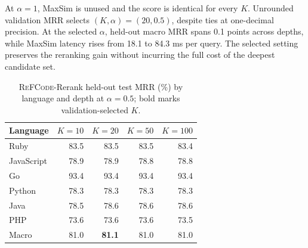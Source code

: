 \documentclass[11pt]{article}
\newcommand{\method}{\textsc{ReFCode}}
\begin{document}
At \(\alpha=1\), MaxSim is unused and the score is identical for every \(K\). Unrounded validation MRR selects \((K,\alpha)=(20,0.5)\), despite ties at one-decimal precision. At the selected \(\alpha\), held-out macro MRR spans 0.1 points across depths, while MaxSim latency rises from 18.1 to 84.3 ms per query. The selected setting preserves the reranking gain without incurring the full cost of the deepest candidate set.

\begin{table}[!t]
    \centering
    \captionsetup{skip=2pt}
    \scriptsize
    \setlength{\tabcolsep}{1.8pt}
    \renewcommand{\arraystretch}{0.92}
    \begin{tabular*}{\columnwidth}{@{\extracolsep{\fill}}lrrrr@{}}
      \toprule
      Language & \(K=10\) & \(K=20\) & \(K=50\) & \(K=100\) \\
      \midrule
      Ruby       & 83.5 & 83.5 & 83.5 & 83.4 \\
      JavaScript & 78.9 & 78.9 & 78.8 & 78.8 \\
      Go         & 93.4 & 93.4 & 93.4 & 93.4 \\
      Python     & 78.3 & 78.3 & 78.3 & 78.3 \\
      Java       & 78.5 & 78.6 & 78.6 & 78.6 \\
      PHP        & 73.6 & 73.6 & 73.6 & 73.5 \\
      \midrule
      Macro      & 81.0 & \textbf{81.1} & 81.0 & 81.0 \\
      \bottomrule
    \end{tabular*}
    \caption{\method{}-Rerank held-out test MRR (\%) by language and depth at \(\alpha=0.5\); bold marks validation-selected \(K\).}
    \label{tab:reranking_depth_language}
\end{table}
\end{document}

